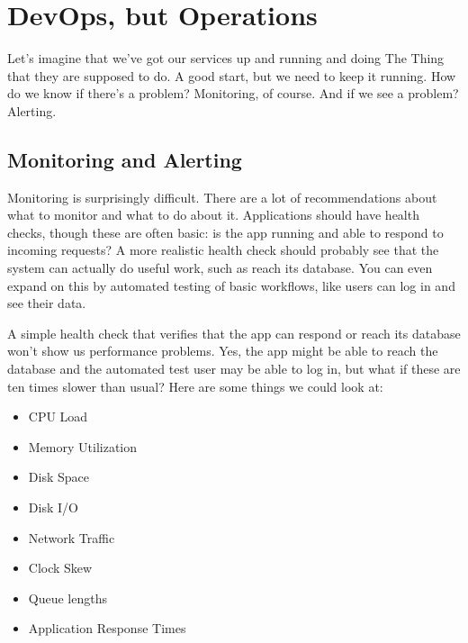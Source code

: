 




\section*{DevOps, but Operations}

Let's imagine that we've got our services up and running and doing The Thing that they are supposed to do. A good start, but we need to keep it running. How do we know if there's a problem? Monitoring, of course. And if we see a problem? Alerting.

\subsection*{Monitoring and Alerting}

Monitoring is surprisingly difficult. There are a lot of recommendations about what to monitor and what to do about it. Applications should have health checks, though these are often basic: is the app running and able to respond to incoming requests? A more realistic health check should probably see that the system can actually do useful work, such as reach its database. You can even expand on this by automated testing of basic workflows, like users can log in and see their data.

A simple health check that verifies that the app can respond or reach its database won't show us performance problems. Yes, the app might be able to reach the database and the automated test user may be able to log in, but what if these are ten times slower than usual? Here are some things we could look at:

\begin{multicols}{2}
\begin{itemize}
	\item CPU Load
	\item Memory Utilization
	\item Disk Space
	\item Disk I/O
	\item Network Traffic
	\item Clock Skew
	\item Queue lengths
	\item Application Response Times
\end{itemize}
\end{multicols}

